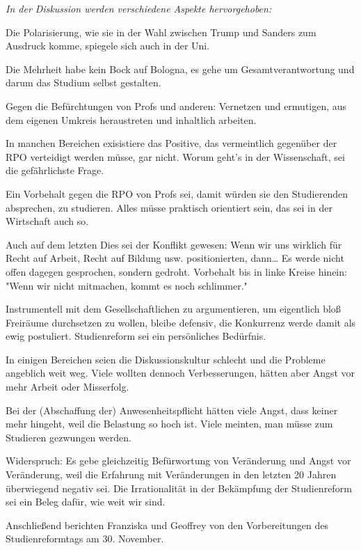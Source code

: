 \documentclass[ngerman,headheight=70pt]{scrartcl}
\begin{document}
    \textit{In der Diskussion werden verschiedene Aspekte hervorgehoben:}

    Die Polarisierung, wie sie in der Wahl zwischen Trump und Sanders zum
    Ausdruck komme, spiegele sich auch in der Uni.

    Die Mehrheit habe kein Bock auf Bologna, es gehe um Gesamtverantwortung und
    darum das Studium selbst gestalten.

    Gegen die Befürchtungen von Profs und anderen: Vernetzen und ermutigen, aus
    dem eigenen Umkreis heraustreten und inhaltlich arbeiten.

    In manchen Bereichen exisistiere das Positive, das vermeintlich gegenüber der
    RPO verteidigt werden müsse, gar nicht. Worum geht’s in der Wissenschaft,
    sei die gefährlichste Frage.

    Ein Vorbehalt gegen die RPO von Profs sei, damit würden sie den Studierenden
    absprechen, zu studieren. Alles müsse praktisch orientiert sein, das sei in
    der Wirtschaft auch so.

    Auch auf dem letzten Dies sei der Konflikt gewesen: Wenn wir uns wirklich für
    Recht auf Arbeit, Recht auf Bildung usw. positionierten, dann… Es werde nicht
    offen dagegen gesprochen, sondern gedroht. Vorbehalt bis in linke Kreise
    hinein: "Wenn wir nicht mitmachen, kommt es noch schlimmer."

    Instrumentell mit dem Gesellschaftlichen zu argumentieren, um eigentlich
    bloß Freiräume durchsetzen zu wollen, bleibe defensiv, die Konkurrenz werde damit
    als ewig postuliert. Studienreform sei ein persönliches Bedürfnis.

    In einigen Bereichen seien die Diskussionskultur schlecht und die Probleme
    angeblich weit weg. Viele wollten dennoch Verbesserungen, hätten aber Angst
    vor mehr Arbeit oder Misserfolg.

    Bei der (Abschaffung der) Anwesenheitspflicht hätten viele Angst, dass keiner
    mehr hingeht, weil die Belastung so hoch ist. Viele meinten, man müsse zum
    Studieren gezwungen werden.

    Widerspruch: Es gebe gleichzeitig Befürwortung von Veränderung und Angst vor
    Veränderung, weil die Erfahrung mit Veränderungen in den letzten 20 Jahren
    überwiegend negativ sei. Die Irrationalität in der Bekämpfung der
    Studienreform sei ein Beleg dafür, wie weit wir sind.

    Anschließend berichten Franziska und Geoffrey von den Vorbereitungen des
    Studienreformtags am 30. November.
\end{document}
